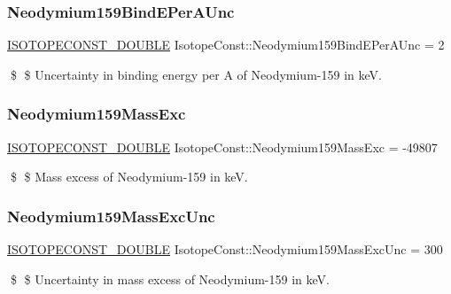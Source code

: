 \subsubsection{\texorpdfstring{Neodymium159\+Bind\+E\+Per\+A\+Unc}{Neodymium159BindEPerAUnc}}
{\footnotesize\ttfamily \mbox{\hyperlink{group___isotope_const-_macros_ga8f45a7272ce02c0b4c65c44636ed719a}{I\+S\+O\+T\+O\+P\+E\+C\+O\+N\+S\+T\+\_\+\+D\+O\+U\+B\+LE}} Isotope\+Const\+::\+Neodymium159\+Bind\+E\+Per\+A\+Unc = 2}

\$ \$ Uncertainty in binding energy per A of Neodymium-\/159 in keV. \mbox{\label{group___isotope_const-_neodymium-_nd159_ga00e2a602096bab7b26c25c3570c7ec23}} 
\subsubsection{\texorpdfstring{Neodymium159\+Mass\+Exc}{Neodymium159MassExc}}
{\footnotesize\ttfamily \mbox{\hyperlink{group___isotope_const-_macros_ga8f45a7272ce02c0b4c65c44636ed719a}{I\+S\+O\+T\+O\+P\+E\+C\+O\+N\+S\+T\+\_\+\+D\+O\+U\+B\+LE}} Isotope\+Const\+::\+Neodymium159\+Mass\+Exc = -\/49807}

\$ \$ Mass excess of Neodymium-\/159 in keV. \mbox{\label{group___isotope_const-_neodymium-_nd159_ga9d236a2bea004332be4352afb9245693}} 
\subsubsection{\texorpdfstring{Neodymium159\+Mass\+Exc\+Unc}{Neodymium159MassExcUnc}}
{\footnotesize\ttfamily \mbox{\hyperlink{group___isotope_const-_macros_ga8f45a7272ce02c0b4c65c44636ed719a}{I\+S\+O\+T\+O\+P\+E\+C\+O\+N\+S\+T\+\_\+\+D\+O\+U\+B\+LE}} Isotope\+Const\+::\+Neodymium159\+Mass\+Exc\+Unc = 300}

\$ \$ Uncertainty in mass excess of Neodymium-\/159 in keV. \mbox{\label{group___isotope_const-_neodymium-_nd159_ga376081a8d653eebce857253180c9c910}} 

